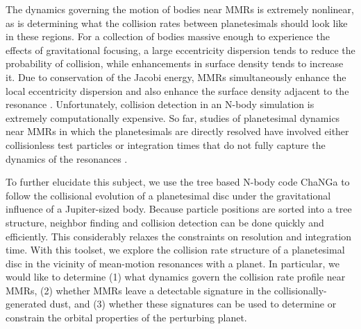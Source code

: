 \documentclass[fleqn,usenatbib]{mnras}
\begin{document}
The dynamics governing the motion of bodies near MMRs is extremely nonlinear, as is determining what the collision rates between planetesimals 
should look like in these regions. For a collection of bodies massive enough to experience the effects of gravitational focusing, a large eccentricity 
dispersion tends to reduce the probability of collision, while enhancements in surface density tends to increase it. Due to conservation of the Jacobi 
energy, MMRs simultaneously enhance the local eccentricity dispersion and also enhance the surface density adjacent to the resonance 
\citep{2000Icar..143...45R, 2017ApJ...850..103B}. Unfortunately, collision detection in an N-body simulation is extremely computationally expensive. 
So far, studies of planetesimal dynamics near MMRs in which the planetesimals are directly resolved have involved either collisionless test particles 
\citep{2017ApJ...850..103B, 2016ApJ...818..159T, 2018ApJ...857....3T} or integration times that do not fully capture the dynamics of the resonances 
\citep{2000Icar..143...45R, 2013ApJ...777L..31D}.

To further elucidate this subject, we use the tree based N-body code {\sc ChaNGa}\citep{2008IEEEpds...ChaNGa, 2015AphCom..2..1}  to follow the 
collisional evolution of a planetesimal disc under the gravitational influence of a Jupiter-sized body. Because particle positions are sorted into a tree 
structure, neighbor finding and collision detection can be done quickly and efficiently. This considerably relaxes the constraints on resolution and 
integration time. With this toolset, we explore the collision rate structure of a planetesimal disc in the vicinity of mean-motion resonances with a planet. In 
particular, we would like to determine (1) what dynamics govern the collision rate profile near MMRs, (2) whether MMRs leave a detectable signature in the
collisionally-generated dust, and (3) whether these signatures can be used to determine or constrain the orbital properties of the perturbing planet.
\end{document}
